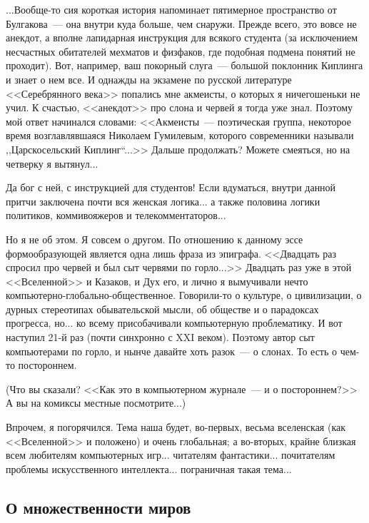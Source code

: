 \documentclass{scrbook}
\newcommand{\glqq}{,,}
\newcommand{\grqq}{``}
\newcommand{\flqq}{<<}
\newcommand{\frqq}{>>}
\newcommand{\mdash}{~--- }
\newcommand{\essaysection}[1]{\subsection*{#1}\nopagebreak}
\begin{document}
...Вообще-то сия короткая история напоминает пятимерное пространство от Булгакова{\mdash}она внутри куда больше, чем снаружи. Прежде всего, это вовсе не анекдот, а вполне лапидарная инструкция для всякого студента (за исключением несчастных обитателей мехматов и физфаков, где подобная подмена понятий не проходит). Вот, например, ваш покорный слуга{\mdash}большой поклонник Киплинга и знает о нем все. И однажды на экзамене по русской литературе {\flqq}Серебрянного века{\frqq} попались мне акмеисты, о которых я ничегошеньки не учил. К счастью, {\flqq}анекдот{\frqq} про слона и червей я тогда уже знал. Поэтому мой ответ начинался словами: {\flqq}Акмеисты{\mdash}поэтическая группа, некоторое время возглавлявшаяся Николаем Гумилевым, которого современники называли {\glqq}Царскосельский Киплинг{\grqq}...{\frqq} Дальше продолжать? Можете смеяться, но на четверку я вытянул...

Да бог с ней, с инструкцией для студентов! Если вдуматься, внутри данной притчи заключена почти вся женская логика... а также половина логики политиков, коммивояжеров и телекомментаторов...

Но я не об этом. Я совсем о другом. По отношению к данному эссе формообразующей является одна лишь фраза из эпиграфа. {\flqq}Двадцать раз спросил про червей и был сыт червями по горло...{\frqq} Двадцать раз уже в этой {\flqq}Вселенной{\frqq} и Казаков, и Дух его, и лично я вымучивали нечто компьютерно-глобально-общественное. Говорили-то о культуре, о цивилизации, о дурных стереотипах обывательской мысли, об обществе и о парадоксах прогресса, но... ко всему присобачивали компьютерную проблематику. И вот наступил 21-й раз (почти синхронно с XXI веком). Поэтому автор сыт компьютерами по горло, и нынче давайте хоть разок{\mdash}о слонах. То есть о чем-то постороннем.

(Что вы сказали? {\flqq}Как это в компьютерном журнале{\mdash}и о постороннем?{\frqq} А вы на комиксы местные посмотрите...)

Впрочем, я погорячился. Тема наша будет, во-первых, весьма вселенская (как {\flqq}Вселенной{\frqq} и положено) и очень глобальная; а во-вторых, крайне близкая всем любителям компьютерных игр... читателям фантастики... почитателям проблемы искусственного интеллекта... пограничная такая тема...

\essaysection{О множественности миров}
\end{document}
